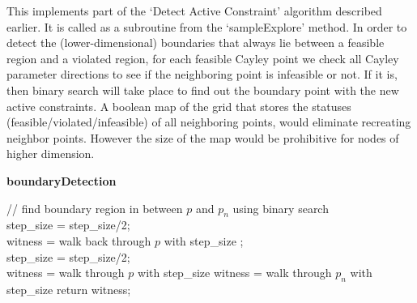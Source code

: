 This implements part of the `Detect Active Constraint' algorithm described
earlier. It is called as a subroutine from the `sampleExplore' method. In
order to detect the (lower-dimensional) boundaries that always lie between a
feasible region and a violated region, for each feasible Cayley point we check
all Cayley parameter directions to see if the neighboring point is infeasible
or not. If it is, then binary search will take place to find out the
boundary point with the new active constraints. A boolean map of the grid that stores
the statuses (feasible/violated/infeasible) of all neighboring points, would
eliminate recreating neighbor points. However the size of the map would be
prohibitive for nodes of higher dimension.

\begin{algorithm} [htbp]

 {\bf boundaryDetection}\\
 \BlankLine

	{
		{
			// find boundary region in between $p$ and $p_n$ using binary search \\

			step\_size = step\_size/2;\\
			witness = walk back through $p$ with step\_size ;\\

			{
				step\_size = step\_size/2; 	\\
				{	witness = walk through $p$ with step\_size }
				{	witness = walk through $p_n$ with step\_size }
			}
		}
	}
	return witness;\\

 \caption{ boundaryDetection
\label{alg:boundaryDetection}}
\end{algorithm}


